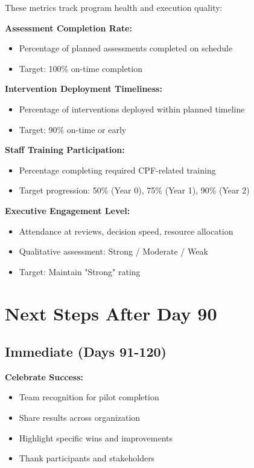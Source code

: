 \documentclass[11pt,a4paper]{article}
\begin{document}
These metrics track program health and execution quality:

\textbf{Assessment Completion Rate:}
\begin{itemize}
\item Percentage of planned assessments completed on schedule
\item Target: 100\% on-time completion
\end{itemize}

\textbf{Intervention Deployment Timeliness:}
\begin{itemize}
\item Percentage of interventions deployed within planned timeline
\item Target: 90\% on-time or early
\end{itemize}

\textbf{Staff Training Participation:}
\begin{itemize}
\item Percentage completing required CPF-related training
\item Target progression: 50\% (Year 0), 75\% (Year 1), 90\% (Year 2)
\end{itemize}

\textbf{Executive Engagement Level:}
\begin{itemize}
\item Attendance at reviews, decision speed, resource allocation
\item Qualitative assessment: Strong / Moderate / Weak
\item Target: Maintain "Strong" rating
\end{itemize}

\section{Next Steps After Day 90}

\subsection{Immediate (Days 91-120)}

\textbf{Celebrate Success:}
\begin{itemize}
\item Team recognition for pilot completion
\item Share results across organization
\item Highlight specific wins and improvements
\item Thank participants and stakeholders
\end{itemize}
\end{document}
